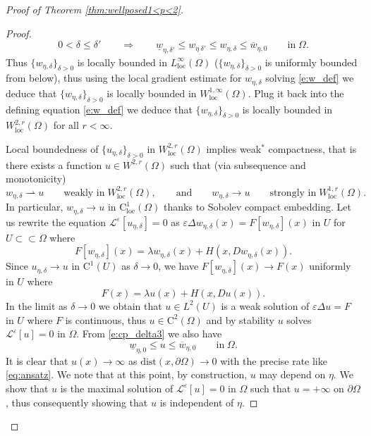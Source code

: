 \documentclass[11pt,reqno]{amsart}
\numberwithin{figure}{section}
\theoremstyle{plain}
\theoremstyle{remark}
\numberwithin{equation}{section}
\newcommand{\rup}{\rightharpoonup}
\begin{document}
\begin{appendices}
\begin{proof} [Proof of Theorem \ref{thm:wellposed1<p<2}]
\begin{proof}
    \begin{equation}\label{e:cp_delta3}
        0<\delta \leq \delta'\qquad\Longrightarrow\qquad \underline{w}_{\eta,\delta'} \leq w_{\eta_,\delta'}\leq w_{\eta,\delta} \leq \overline{w}_{\eta,0} \qquad\text{in}\;\Omega.
    \end{equation}
    Thus $\{w_{\eta,\delta}\}_{\delta>0}$ is locally bounded in $L^{\infty}_{\mathrm{loc}}(\Omega)$ ($\{w_{\eta,\delta}\}_{\delta>0}$ is uniformly bounded from below), thus using the local gradient estimate for $w_{\eta,\delta}$ solving \eqref{e:w_def} we deduce that $\{w_{\eta,\delta}\}_{\delta>0}$ is locally bounded in $W^{1,\infty}_{\mathrm{loc}}(\Omega)$. Plug it back into the defining equation \eqref{e:w_def} we deduce that $\{w_{\eta,\delta}\}_{\delta>0}$ is locally bounded in $W^{2,r}_{\mathrm{loc}}(\Omega)$ for all $r<\infty$.
    
    \noindent Local boundedness of $\{u_{\eta,\delta}\}_{\delta>0}$ in $W^{2,r}_{\mathrm{loc}}(\Omega)$ implies weak$^*$ compactness, that is there exists a function $u\in W^{2,r}(\Omega)$ such that (via subsequence and monotonicity)
    \begin{equation*}
        w_{\eta,\delta} \rup u \qquad\text{weakly in}\;W^{2,r}_{\mathrm{loc}}(\Omega),\qquad \text{and}\qquad
        w_{\eta,\delta} \to u \qquad\text{strongly in}\;W^{1,r}_{\mathrm{loc}}(\Omega).
    \end{equation*}
    In particular, $w_{\eta,\delta}\to u$ in $\mathrm{C}^1_{\mathrm{loc}}(\Omega)$ thanks to Sobolev compact embedding. Let us rewrite the equation $\mathcal{L}^\varepsilon\left[u_{\eta,\delta}\right] = 0$ as $\varepsilon\Delta w_{\eta,\delta}(x) = F[w_{\eta,\delta}](x)$ in $U$ for $U\subset\subset \Omega$ where
    \begin{equation*}
        F[w_{\eta,\delta}](x) =  \lambda w_{\eta,\delta}(x) + H(x,Dw_{\eta,\delta}(x)).
    \end{equation*}
    Since $u_{\eta,\delta}\to u$ in $\mathrm{C}^1(U)$ as $\delta\to 0$, we have $F[w_{\eta,\delta}](x) \to F(x)$ uniformly in $U$ where 
    \begin{equation*}
        F(x) = \lambda u(x) + H(x,Du(x)).
    \end{equation*}
    In the limit as $\delta\to 0$ we obtain that $u\in L^2(U)$ is a weak solution of $\varepsilon\Delta u = F$ in $U$ where $F$ is continuous, thus $u\in \mathrm{C}^2(\Omega)$ and by stability $u$ solves $\mathcal{L}^\varepsilon[u] = 0$ in $\Omega$. From \eqref{e:cp_delta3} we also have
    \begin{equation*}
        \underline{w}_{\eta,0} \leq u \leq \overline{w}_{\eta,0} \qquad\text{in}\;\Omega.
    \end{equation*}
    It is clear that $u(x)\to \infty$ as $\mathrm{dist}(x,\partial\Omega)\to 0$ with the precise rate like \eqref{eq:ansatz}. We note that at this point, by construction, $u$ may depend on $\eta$. We show that $u$ is the maximal solution of $\mathcal{L}^\varepsilon[u] = 0$ in $\Omega$ such that $u = +\infty$ on $\partial\Omega$, thus consequently showing that $u$ is independent of $\eta$.
    

\end{proof}
\end{proof}
\end{appendices}
\end{document}
